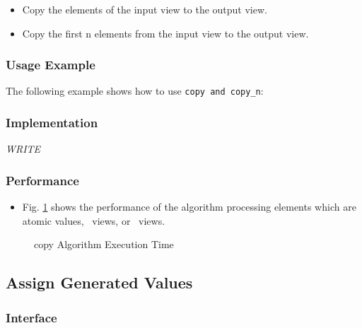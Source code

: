\begin{itemize}
\item
Copy the elements of the input view to the output view. 
\item
Copy the first n elements from the input view to the output view. 
\end{itemize}
 
\subsubsection{Usage Example} %

The following example shows how to use \texttt{copy and copy\_n}:

 
\subsubsection{Implementation} %

\textit{WRITE}

\subsubsection{Performance} %

\begin{itemize}
\item
Fig. \ref{fig:copy-alg-exec-exper}
shows the performance of the algorithm processing
elements which are atomic values, \stl\ views, or \stapl\ views.
\end{itemize}

\begin{figure}[p]
\caption{copy Algorithm Execution Time}
\label{fig:copy-alg-exec-exper}
\end{figure}


\subsection{Assign Generated Values} \label{sec-muta-generate}

\subsubsection{Interface} %

